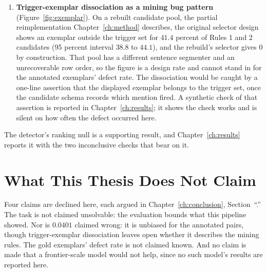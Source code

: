 \begin{enumerate}
\item \textbf{Trigger-exemplar dissociation as a mining bug pattern}
(Figure~\ref{fig:exemplar}). On a rebuilt candidate pool, the partial reimplementation Chapter~\ref{ch:method} describes, the original selector design shows
an exemplar outside the trigger set for $41.4$ percent of Rules 1 and 2 candidates (95 percent
interval $38.8$ to $44.1$), and the rebuild's selector gives $0$ by construction. That pool
has a different sentence segmenter and an unrecoverable row order, so the figure is a design
rate and cannot stand in for the annotated exemplars' defect rate. The dissociation would be caught by a one-line assertion that the displayed exemplar belongs to the
trigger set, once the candidate schema records which mention fired. A synthetic check of that assertion is reported in
Chapter~\ref{ch:results}; it shows the check works and is silent on how often the defect occurred
here.
\end{enumerate}

The detector's ranking null is a supporting result, and Chapter~\ref{ch:results} reports it with
the two inconclusive checks that bear on it.

\section{What This Thesis Does Not Claim}
\label{sec:intro-notclaim}

Four claims are declined here, each argued in Chapter~\ref{ch:conclusion},
Section~``.'' The task is not claimed unsolvable: the evaluation bounds
what this pipeline showed. Nor is $0.0401$ claimed wrong: it is unbiased for the annotated pairs,
though trigger-exemplar dissociation leaves open whether it describes the mining rules. The gold
exemplars' defect rate is not claimed known. And no claim is made that a frontier-scale model
would not help, since no such model's results are reported here.

